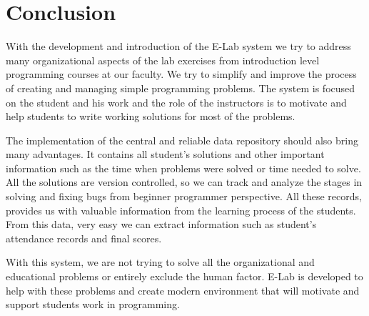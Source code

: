 \documentclass{llncs}
\begin{document}
\section{Conclusion}

With the development and introduction of the E-Lab system we try to address many
organizational aspects of the lab exercises from introduction level programming
courses at our faculty. We try to simplify and improve the process of creating
and managing simple programming problems. The system is focused on the student
and his work and the role of the instructors is to motivate and help students to
write working solutions for most of the problems.

The implementation of the central and reliable data repository should also bring
many advantages. It contains all student's solutions and other important
information such as the time when problems were solved or time needed to solve.
All the solutions are version controlled, so we can track and analyze the stages
in solving and fixing bugs from beginner programmer perspective. All these
records, provides us with valuable information from the learning process of the
students. From this data, very easy we can extract information such as student's
attendance records and final scores.

With this system, we are not trying to solve all the organizational and
educational problems or entirely exclude the human factor. E-Lab is developed to
help with these problems and create modern environment that will motivate and
support students work in programming.




\end{document}
